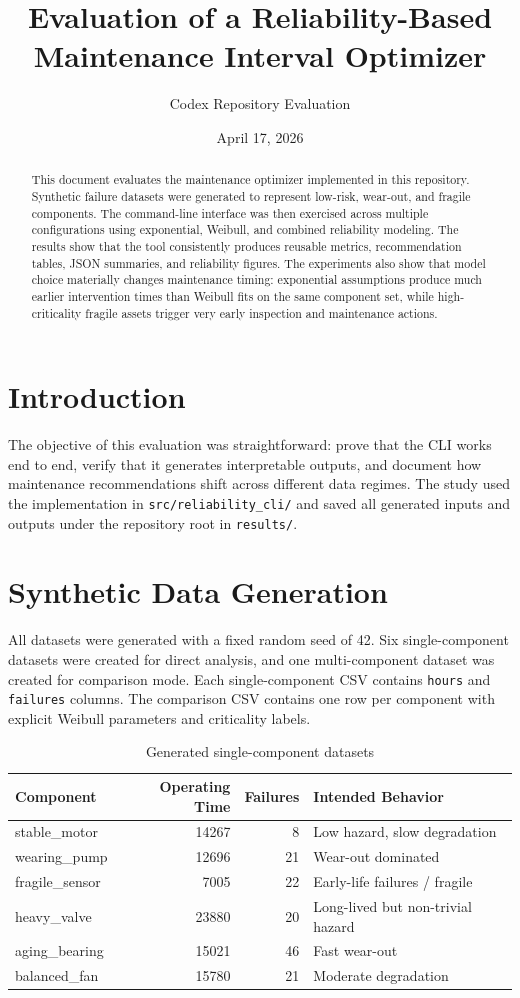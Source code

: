 \documentclass[11pt]{article}
\title{Evaluation of a Reliability-Based Maintenance Interval Optimizer}
\author{Codex Repository Evaluation}
\date{April 17, 2026}
\begin{document}
\maketitle

\begin{abstract}
This document evaluates the maintenance optimizer implemented in this repository. Synthetic failure datasets were generated to represent low-risk, wear-out, and fragile components. The command-line interface was then exercised across multiple configurations using exponential, Weibull, and combined reliability modeling. The results show that the tool consistently produces reusable metrics, recommendation tables, JSON summaries, and reliability figures. The experiments also show that model choice materially changes maintenance timing: exponential assumptions produce much earlier intervention times than Weibull fits on the same component set, while high-criticality fragile assets trigger very early inspection and maintenance actions.
\end{abstract}

\section{Introduction}
The objective of this evaluation was straightforward: prove that the CLI works end to end, verify that it generates interpretable outputs, and document how maintenance recommendations shift across different data regimes. The study used the implementation in \texttt{src/reliability\_cli/} and saved all generated inputs and outputs under the repository root in \texttt{results/}.

\section{Synthetic Data Generation}
All datasets were generated with a fixed random seed of 42. Six single-component datasets were created for direct analysis, and one multi-component dataset was created for comparison mode. Each single-component CSV contains \texttt{hours} and \texttt{failures} columns. The comparison CSV contains one row per component with explicit Weibull parameters and criticality labels.

\begin{table}[H]
\centering
\caption{Generated single-component datasets}
\begin{tabular}{lrrl}
\toprule
Component & Operating Time & Failures & Intended Behavior \\
\midrule
stable\_motor & 14267 & 8 & Low hazard, slow degradation \\
wearing\_pump & 12696 & 21 & Wear-out dominated \\
fragile\_sensor & 7005 & 22 & Early-life failures / fragile \\
heavy\_valve & 23880 & 20 & Long-lived but non-trivial hazard \\
aging\_bearing & 15021 & 46 & Fast wear-out \\
balanced\_fan & 15780 & 21 & Moderate degradation \\
\bottomrule
\end{tabular}
\end{table}
\end{document}
